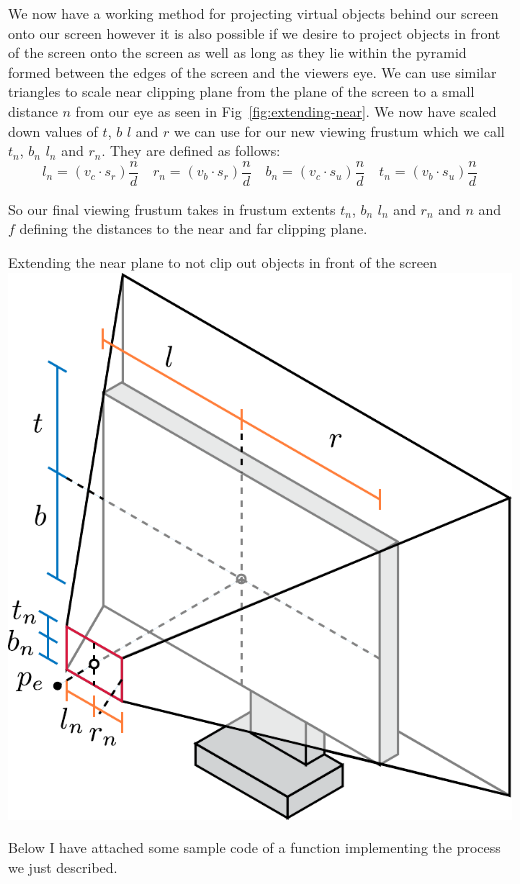 We now have a working method for projecting virtual objects behind our screen onto our screen however it is also possible if we desire to project objects in front of the screen onto the screen as well as long as they lie within the pyramid formed between the edges of the screen and the viewers eye. We can use similar triangles to scale near clipping plane from the plane of the screen to a small distance $n$ from our eye as seen in Fig~\ref{fig:extending-near}. We now have scaled down values of $t$, $b$ $l$ and $r$ we can use for our new viewing frustum which we call $t_n$, $b_n$ $l_n$ and $r_n$. They are defined as follows:
\[
    l_n = (v_c \cdot s_r) \frac{n}{d} \quad r_n = (v_b \cdot s_r) \frac{n}{d} \quad b_n = (v_c \cdot s_u) \frac{n}{d} \quad t_n = (v_b \cdot s_u) \frac{n}{d}
\]

So our final viewing frustum takes in frustum extents $t_n$, $b_n$ $l_n$ and $r_n$ and $n$ and $f$ defining the distances to the near and far clipping plane.
\begin{figureBox}[label={fig:extending-near}]{Extending the near plane to not clip out objects in front of the screen}
    \centering
    \includegraphics[width = 0.5\linewidth]{./background/figures/projection/extending-near.pdf}
\end{figureBox}


Below I have attached some sample code of a function implementing the process we just described.

